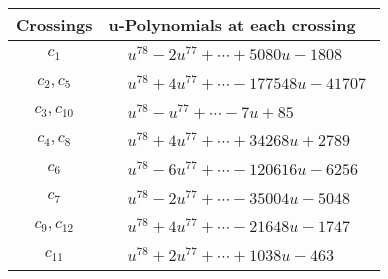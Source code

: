 \documentclass[1p]{elsarticle_modified}
\theoremstyle{definition}
\begin{document}
\begin{tabular}{m{50pt}|m{274pt}}
Crossings & \hspace{64pt}u-Polynomials at each crossing \\
\hline $$\begin{aligned}c_{1}\end{aligned}$$&$\begin{aligned}
&u^{78}-2 u^{77}+\cdots+5080 u-1808
\end{aligned}$\\
\hline $$\begin{aligned}c_{2},c_{5}\end{aligned}$$&$\begin{aligned}
&u^{78}+4 u^{77}+\cdots-177548 u-41707
\end{aligned}$\\
\hline $$\begin{aligned}c_{3},c_{10}\end{aligned}$$&$\begin{aligned}
&u^{78}- u^{77}+\cdots-7 u+85
\end{aligned}$\\
\hline $$\begin{aligned}c_{4},c_{8}\end{aligned}$$&$\begin{aligned}
&u^{78}+4 u^{77}+\cdots+34268 u+2789
\end{aligned}$\\
\hline $$\begin{aligned}c_{6}\end{aligned}$$&$\begin{aligned}
&u^{78}-6 u^{77}+\cdots-120616 u-6256
\end{aligned}$\\
\hline $$\begin{aligned}c_{7}\end{aligned}$$&$\begin{aligned}
&u^{78}-2 u^{77}+\cdots-35004 u-5048
\end{aligned}$\\
\hline $$\begin{aligned}c_{9},c_{12}\end{aligned}$$&$\begin{aligned}
&u^{78}+4 u^{77}+\cdots-21648 u-1747
\end{aligned}$\\
\hline $$\begin{aligned}c_{11}\end{aligned}$$&$\begin{aligned}
&u^{78}+2 u^{77}+\cdots+1038 u-463
\end{aligned}$\\
\hline
\end{tabular}\\~\\
\end{document}
